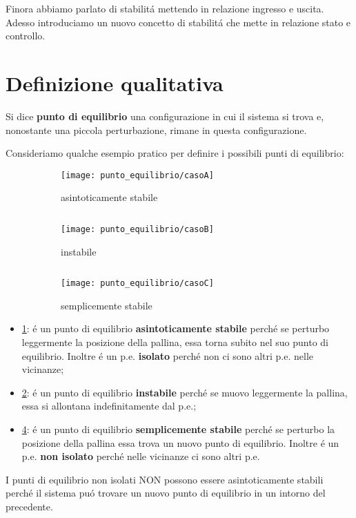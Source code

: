 \documentclass[../main.tex]{subfiles}
\begin{document}
	\newcommand{\pe}[1]{\hat{\vec #1}}
	Finora abbiamo parlato di stabilit\'a mettendo in relazione ingresso e uscita. Adesso introduciamo un nuovo concetto di stabilit\'a che mette in relazione stato e controllo.
		
	\section{Definizione qualitativa}
		Si dice \textbf{punto di equilibrio} una configurazione in cui il sistema si trova e, nonostante una piccola perturbazione, rimane in questa configurazione.
		
		Consideriamo qualche esempio pratico per definire i possibili punti di equilibrio:
		\begin{figure}[H]
			\centering
			\begin{subfigure}{0.24\textwidth}
				\texttt{[image: punto\_equilibrio/casoA]}
				\caption{asintoticamente stabile}
				\label{fig:asint_stab}
			\end{subfigure}
			$\;\;\;\;\;\;$
			\centering
			\begin{subfigure}{0.24\textwidth}
				\texttt{[image: punto\_equilibrio/casoB]}
				\caption{instabile}
				\label{fig:instabile}
			\end{subfigure}
			$\;\;\;\;\;\;$
			\centering
			\begin{subfigure}{0.24\textwidth}
				\texttt{[image: punto\_equilibrio/casoC]}
				\caption{semplicemente stabile}
				\label{fig:sempl_stab}
			\end{subfigure}
			\caption{}
		\end{figure}
	
		\begin{itemize}
			\item
				\ref{fig:asint_stab}: \'e un punto di equilibrio \textbf{asintoticamente stabile} perch\'e se perturbo leggermente la posizione della pallina, essa torna subito nel suo punto di equilibrio. Inoltre \'e un p.e. \textbf{isolato} perch\'e non ci sono altri p.e. nelle vicinanze;
			\item
				\ref{fig:instabile}: \'e un punto di equilibrio \textbf{instabile} perch\'e se muovo leggermente la pallina, essa si allontana indefinitamente dal p.e.;
			\item
				\ref{fig:sempl_stab}: \'e un punto di equilibrio \textbf{semplicemente stabile} perch\'e se perturbo la posizione della pallina essa trova un nuovo punto di equilibrio. Inoltre \'e un p.e. \textbf{non isolato} perch\'e nelle vicinanze ci sono altri p.e.
		\end{itemize}
		I punti di equilibrio non isolati NON possono essere asintoticamente stabili perch\'e il sistema pu\'o trovare un nuovo punto di equilibrio in un intorno del precedente.
		
\end{document}
